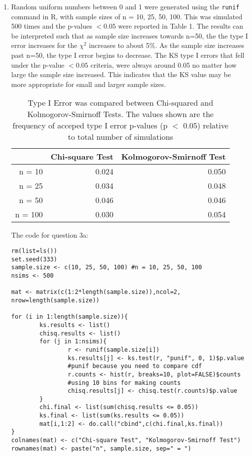 \documentclass{article}
\begin{document}
\begin{enumerate}
\begin{enumerate}
\item Random uniform numbers between 0 and 1 were generated using the {\tt{runif}} command in R, with sample sizes of n = 10, 25, 50, 100. This was simulated 500 times and the p-values $< 0.05$ were reported in Table 1. The results can be interpreted such that as sample size increases towards n=50, the the type I error increases for the $\chi^2$ increases to about 5\%. As the sample size increases past n=50, the type I error begins to decrease. The KS type I errors that fell under the p-value $< 0.05$ criteria, were always around 0.05 no matter how large the sample size increased. This indicates that the KS value may be more appropriate for small and larger sample sizes. 

\begin{table}[ht]
\centering
\caption{Type I Error was compared between Chi-squared and Kolmogorov-Smirnoff Tests. The values shown are the frequency of acceped type I error p-values (p $<$ 0.05) relative to total number of simulations}
\begin{tabular}{rrr}
  \hline
 & Chi-square Test & Kolmogorov-Smirnoff Test \\
  \hline
n = 10 & 0.024 & 0.050 \\ 
  n = 25 & 0.034 & 0.048 \\ 
  n = 50 & 0.046 & 0.046 \\ 
  n = 100 & 0.030 & 0.054 \\ 
   \hline
\end{tabular}
\end{table}

The code for question 3a:

\begin{verbatim}
rm(list=ls())
set.seed(333)
sample.size <- c(10, 25, 50, 100) #n = 10, 25, 50, 100
nsims <- 500

mat <- matrix(c(1:2*length(sample.size)),ncol=2, nrow=length(sample.size))

for (i in 1:length(sample.size)){
        ks.results <- list()
        chisq.results <- list()
        for (j in 1:nsims){
                r <- runif(sample.size[i])
                ks.results[j] <- ks.test(r, "punif", 0, 1)$p.value 
                #punif because you need to compare cdf
                r.counts <- hist(r, breaks=10, plot=FALSE)$counts 
                #using 10 bins for making counts
                chisq.results[j] <- chisq.test(r.counts)$p.value
        }
        chi.final <- list(sum(chisq.results <= 0.05))
        ks.final <- list(sum(ks.results <= 0.05))
        mat[i,1:2] <- do.call("cbind",c(chi.final,ks.final))
}
colnames(mat) <- c("Chi-square Test", "Kolmogorov-Smirnoff Test")
rownames(mat) <- paste("n", sample.size, sep=" = ")
\end{verbatim}


\end{enumerate}
\end{enumerate}
\end{document}

